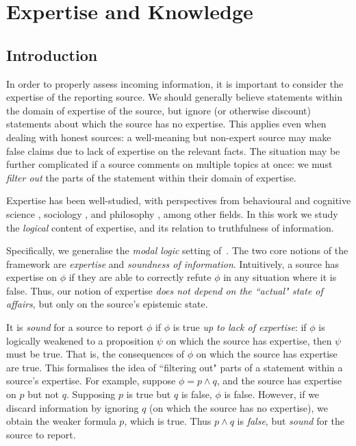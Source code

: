 \chapter{Expertise and Knowledge}

\section{Introduction}

In order to properly assess incoming information, it is important to consider
the expertise of the reporting source. We should generally believe statements
within the domain of expertise of the source, but ignore (or otherwise
discount) statements about which the source has no expertise. This applies even
when dealing with honest sources: a well-meaning but non-expert source may make
false claims due to lack of expertise on the relevant facts.
%
The situation may be further complicated if a source comments on multiple
topics at once: we must \emph{filter out} the parts of the statement within
their domain of expertise.

Expertise has been well-studied, with perspectives from behavioural and
cognitive science \cite{chi2014nature,ericsson2010expertise}, sociology
\cite{collins2008rethinking}, and philosophy
\cite{kilov2021brittleness,whyte2010trust,goldman2018expertise}, among other
fields. In this work we study the \emph{logical} content of expertise, and its
relation to truthfulness of information.

Specifically, we generalise the \emph{modal logic} setting
of~\textcite{singleton2021logic}. The two core notions of the framework are
\emph{expertise} and \emph{soundness of information}. Intuitively, a source has
expertise on $\phi$ if they are able to correctly refute $\phi$ in any
situation where it is false.\footnotemark{} Thus, our notion of expertise
\emph{does not depend on the ``actual" state of affairs}, but only on the
source's epistemic state.


It is \emph{sound} for a source to report $\phi$ if $\phi$ is true \emph{up to
lack of expertise}: if $\phi$ is logically weakened to a proposition $\psi$ on
which the source has expertise, then $\psi$ must be true. That is, the
consequences of $\phi$ on which the source has expertise are true.
%
This formalises the idea of ``filtering out" parts of a statement within a
source's expertise. For example, suppose $\phi = p \land q$, and the source has
expertise on $p$ but not $q$. Supposing $p$ is true but $q$ is false, $\phi$ is
false. However, if we discard information by ignoring $q$ (on which the source
has no expertise), we obtain the weaker formula $p$, which is true. Thus $p
\land q$ is \emph{false}, but \emph{sound} for the source to report.

